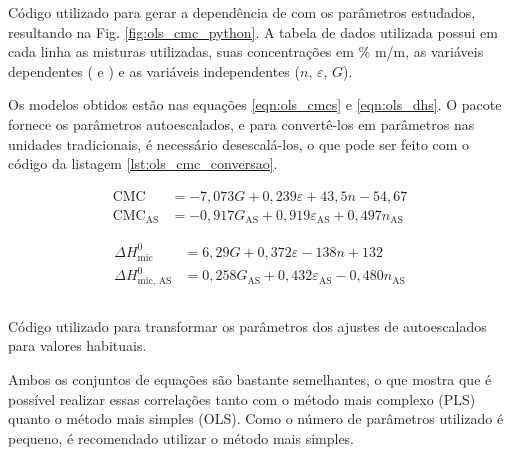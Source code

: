 		\begin{listing}[h]
			\inputminted{python}{./python/ols_cmc_statsmodels.py}
			\caption{Código utilizado para gerar a dependência de \cmc{} com os parâmetros estudados, resultando na Fig. \ref{fig:ols_cmc_python}. A tabela de dados utilizada possui em cada linha as misturas utilizadas, suas concentrações em \% m/m, as variáveis dependentes (\cmc{} e \DHmic) e as variáveis independentes (\(n\), \(\varepsilon\), \(G\)).}
			\label{lst:ols_cmc_python}
		\end{listing}
		
		Os modelos obtidos estão nas equações \ref{eqn:ols_cmcs} e \ref{eqn:ols_dhs}. O pacote fornece os parâmetros autoescalados, e para convertê-los em parâmetros nas unidades tradicionais, é necessário desescalá-los, o que pode ser feito com o código da listagem \ref{lst:ols_cmc_conversao}.
		
		\begin{subequations}
			\begin{align}
			\textrm{CMC}               & = -7{,}073G              + 0{,}239\varepsilon             + 43{,}5n              -54{,}67  \label{eqn:ols_cmc}     \\
			\textrm{CMC}_{\textrm{AS}} & = -0{,}917G_\textrm{AS}  + 0{,}919\varepsilon_\textrm{AS} +0{,}497n_\textrm{AS}          \label{eqn:ols_cmc_AS}
			\end{align}
			\label{eqn:ols_cmcs}
		\end{subequations}
		
		\begin{subequations}
			\begin{align}
			\Delta H_\textrm{mic}^0     & = 6{,}29G              + 0{,}372\varepsilon             - 138n               + 132  \label{eqn:ols_dh} \\
			\Delta H_\textrm{mic, AS}^0 & = 0{,}258G_\textrm{AS} + 0{,}432\varepsilon_\textrm{AS} - 0{,}480n_\textrm{AS}        \label{eqn:ols_dh_AS}
			\end{align}
			\label{eqn:ols_dhs}
		\end{subequations}
		
		\begin{listing}[h]
			\inputminted{python}{./python/ols_cmc_conversão.py}
			\caption{Código utilizado para transformar os parâmetros dos ajustes de autoescalados para valores habituais.}
			\label{lst:ols_cmc_conversao}
		\end{listing}
		
		Ambos os conjuntos de equações são bastante semelhantes, o que mostra que é possível realizar essas correlações tanto com o método mais complexo (PLS) quanto o método mais simples (OLS). Como o número de parâmetros utilizado é pequeno, é recomendado utilizar o método mais simples. %
		
